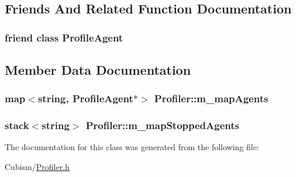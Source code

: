 \subsection{Friends And Related Function Documentation}
\hypertarget{class_profiler_a92aee0ec8225cca509a1c268317672d1}{}
\subsubsection[{Profile\+Agent}]{\setlength{\rightskip}{0pt plus 5cm}friend class {\bf Profile\+Agent}\hspace{0.3cm}{\ttfamily [friend]}}\label{class_profiler_a92aee0ec8225cca509a1c268317672d1}


\subsection{Member Data Documentation}
\hypertarget{class_profiler_a289df33e2c71075ff9bf2d2c3e180c02}{}
\subsubsection[{m\+\_\+map\+Agents}]{\setlength{\rightskip}{0pt plus 5cm}map$<$string, {\bf Profile\+Agent}$\ast$$>$ Profiler\+::m\+\_\+map\+Agents\hspace{0.3cm}{\ttfamily [protected]}}\label{class_profiler_a289df33e2c71075ff9bf2d2c3e180c02}
\hypertarget{class_profiler_a898eec43a1f9c8ed482d169e90f4a7bd}{}
\subsubsection[{m\+\_\+map\+Stopped\+Agents}]{\setlength{\rightskip}{0pt plus 5cm}stack$<$string$>$ Profiler\+::m\+\_\+map\+Stopped\+Agents\hspace{0.3cm}{\ttfamily [protected]}}\label{class_profiler_a898eec43a1f9c8ed482d169e90f4a7bd}


The documentation for this class was generated from the following file\+:\begin{DoxyCompactItemize}
\item 
Cubism/\hyperlink{_profiler_8h}{Profiler.\+h}\end{DoxyCompactItemize}
